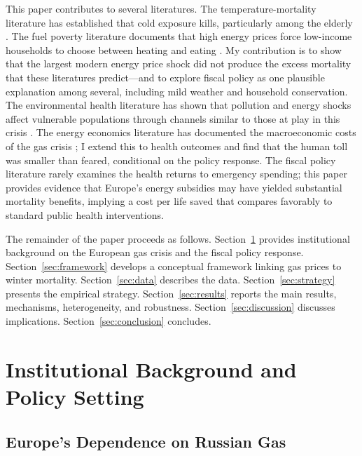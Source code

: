 \documentclass[12pt]{article}
\begin{document}
This paper contributes to several literatures. The temperature-mortality literature has established that cold exposure kills, particularly among the elderly \citep{deschenes2011, barreca2016, heutel2021, gasparrini2015}. The fuel poverty literature documents that high energy prices force low-income households to choose between heating and eating \citep{beatty2014, hills2019, fowlie2018}. My contribution is to show that the largest modern energy price shock did not produce the excess mortality that these literatures predict---and to explore fiscal policy as one plausible explanation among several, including mild weather and household conservation. The environmental health literature has shown that pollution and energy shocks affect vulnerable populations through channels similar to those at play in this crisis \citep{chay2003, currie2014}. The energy economics literature has documented the macroeconomic costs of the gas crisis \citep{bachmann2022, ruhnau2023, neumann2023}; I extend this to health outcomes and find that the human toll was smaller than feared, conditional on the policy response. The fiscal policy literature rarely examines the health returns to emergency spending; this paper provides evidence that Europe's energy subsidies may have yielded substantial mortality benefits, implying a cost per life saved that compares favorably to standard public health interventions.

The remainder of the paper proceeds as follows. Section~\ref{sec:background} provides institutional background on the European gas crisis and the fiscal policy response. Section~\ref{sec:framework} develops a conceptual framework linking gas prices to winter mortality. Section~\ref{sec:data} describes the data. Section~\ref{sec:strategy} presents the empirical strategy. Section~\ref{sec:results} reports the main results, mechanisms, heterogeneity, and robustness. Section~\ref{sec:discussion} discusses implications. Section~\ref{sec:conclusion} concludes.


\section{Institutional Background and Policy Setting}
\label{sec:background}

\subsection{Europe's Dependence on Russian Gas}
\end{document}
